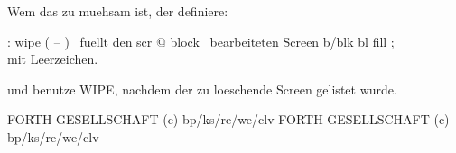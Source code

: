Wem das zu muehsam ist, der definiere:   
                                         
: wipe  ( -- )   \  fuellt den           
 scr @ block     \  bearbeiteten Screen  
 b/blk bl fill ; \\ mit Leerzeichen.     
                                         
und benutze WIPE, nachdem der zu         
loeschende Screen gelistet wurde.        
                                         
FORTH-GESELLSCHAFT  (c) bp/ks/re/we/clv 
FORTH-GESELLSCHAFT  (c) bp/ks/re/we/clv  
                                         
                                         
                                         
                                         
                                         
                                         
                                         
                                         
                                         
                                         
                                         
                                         
                                         
                                         
                                         
                                         
                                         
                                         
                                         
                                         
                                         
                                         
                                         
                                        
                                         
                                         
                                         
                                         
                                         
                                         
                                         
                                         
                                         
